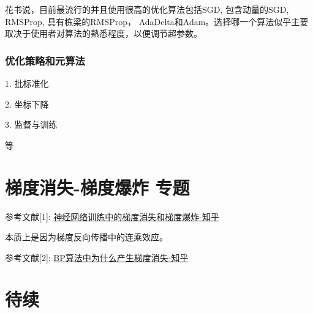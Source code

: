 花书说，目前最流行的并且使用很高的优化算法包括SGD, 包含动量的SGD, RMSProp, 具有栋梁的RMSProp， AdaDelta和Adam。选择哪一个算法似乎主要取决于使用者对算法的熟悉程度，以便调节超参数。

\subsubsection{优化策略和元算法}

1. 批标准化

2. 坐标下降

3. 监督与训练

等


\section{梯度消失-梯度爆炸 专题}

参考文献[1]: \href{https://zhuanlan.zhihu.com/p/25631496}{神经网络训练中的梯度消失和梯度爆炸-知乎}

本质上是因为梯度反向传播中的连乘效应。

参考文献[2]: \href{https://www.zhihu.com/question/49812013}{BP算法中为什么产生梯度消失-知乎}



\section{待续}













